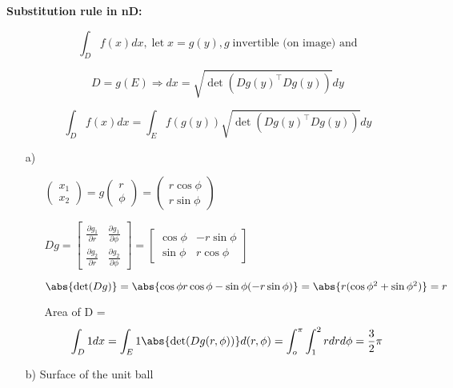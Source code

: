 \newpage
{
	\blank
\textbf{Substitution rule in nD:}
\begin{itemize}
	\item[] \[ \int_D f(x)dx, \; \text{let}\; x=g(y), g \; \text{invertible (on image) and} \]
	\item[] \[ D = g(E) \Rightarrow dx = \sqrt{\det(Dg(y)^\top Dg(y))}dy\] 
	\item[] \[ \int_D f(x)dx = \int_E f(g(y))\sqrt{\det(Dg(y)^\top Dg(y))}dy\]
\end{itemize}
\begin{bsp}
	\begin{itemize}
		\item[a)]\begin{itemize}
			\item[] $\left(\begin{array}{c}
			x_1\\
			x_2
			\end{array}\right) = g \left(\begin{array}{c}
			r\\
			\phi
			\end{array}\right) = \left(\begin{array}{c}
			r \cos{\phi}\\
			r \sin{\phi}
			\end{array}\right)$\\
			\item[] $Dg = \begin{bmatrix}
			\frac{\partial g_1}{\partial r} & \frac{\partial g_1}{\partial \phi}\\
			\frac{\partial g_2}{\partial r} & \frac{\partial g_2}{\partial \phi}
			\end{bmatrix} = \begin{bmatrix}
			\cos{\phi} & -r\sin{\phi} \\
			\sin{\phi} & r\cos{\phi}
			\end{bmatrix}$\\
			\item[] $\abs{\det(Dg)} = \abs{\cos{\phi r}\cos{\phi} - \sin{\phi}(-r\sin{\phi})} = \abs{r(\cos{\phi}^2 + \sin{\phi}^2)} = r$\\
			\item[] Area of D = \[ \int_D 1dx = \int_E 1\abs{\det(Dg(r,\phi))}d(r,\phi) = \int_o^\pi \int_1^2 rdrd\phi = \frac{3}{2}\pi\]
		\end{itemize}
		\item[b)] Surface of the unit ball\\

\end{itemize}
\end{bsp}}
